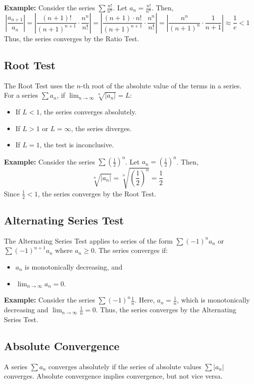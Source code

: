 \documentclass{article}
\begin{document}
\textbf{Example:}
Consider the series \(\sum \frac{n!}{n^n}\). Let \(a_n = \frac{n!}{n^n}\). Then,
\[
\left| \frac{a_{n+1}}{a_n} \right| = \left| \frac{(n+1)!}{(n+1)^{n+1}} \cdot \frac{n^n}{n!} \right| = \left| \frac{(n+1) \cdot n!}{(n+1)^{n+1}} \cdot \frac{n^n}{n!} \right| = \left| \frac{n^n}{(n+1)^n} \cdot \frac{1}{n+1} \right| \approx \frac{1}{e} < 1
\]
Thus, the series converges by the Ratio Test.

\subsection*{Root Test}
The Root Test uses the \(n\)-th root of the absolute value of the terms in a series. For a series \(\sum a_n\), if \(\lim_{n \to \infty} \sqrt[n]{|a_n|} = L\):
\begin{itemize}
    \item If \(L < 1\), the series converges absolutely.
    \item If \(L > 1\) or \(L = \infty\), the series diverges.
    \item If \(L = 1\), the test is inconclusive.
\end{itemize}

\textbf{Example:}
Consider the series \(\sum \left( \frac{1}{2} \right)^n\). Let \(a_n = \left( \frac{1}{2} \right)^n\). Then,
\[ \sqrt[n]{|a_n|} = \sqrt[n]{\left( \frac{1}{2} \right)^n} = \frac{1}{2} \]
Since \(\frac{1}{2} < 1\), the series converges by the Root Test.

\subsection*{Alternating Series Test}
The Alternating Series Test applies to series of the form \(\sum (-1)^n a_n\) or \(\sum (-1)^{n+1} a_n\) where \(a_n \geq 0\). The series converges if:
\begin{itemize}
    \item \(a_n\) is monotonically decreasing, and
    \item \(\lim_{n \to \infty} a_n = 0\).
\end{itemize}

\textbf{Example:}
Consider the series \(\sum (-1)^n \frac{1}{n}\). Here, \(a_n = \frac{1}{n}\), which is monotonically decreasing and \(\lim_{n \to \infty} \frac{1}{n} = 0\). Thus, the series converges by the Alternating Series Test.

\subsection*{Absolute Convergence}
A series \(\sum a_n\) converges absolutely if the series of absolute values \(\sum |a_n|\) converges. Absolute convergence implies convergence, but not vice versa.
\end{document}

